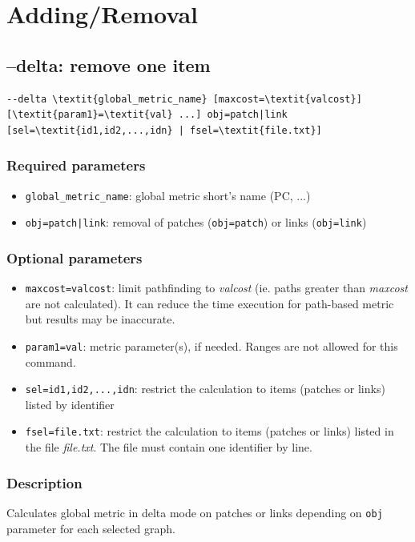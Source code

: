 \documentclass[a4paper,10pt]{report}
\begin{document}
\section{Adding/Removal}
\subsection{--delta: remove one item}
\begin{Verbatim}[commandchars=\\\{\}]
--delta \textit{global_metric_name} [maxcost=\textit{valcost}] [\textit{param1}=\textit{val} ...] obj=patch|link
[sel=\textit{id1,id2,...,idn} | fsel=\textit{file.txt}]
\end{Verbatim}

\subsubsection{Required parameters}
\begin{itemize}
	\item \verb|global_metric_name|: global metric short's name (PC, ...)
	\item \verb+obj=patch|link+: removal of patches (\verb+obj=patch+) or links (\verb+obj=link+)
\end{itemize}

\subsubsection{Optional parameters}
\begin{itemize}
	\item \verb|maxcost=valcost|: limit pathfinding to \textit{valcost} (ie. paths greater than \textit{maxcost} are not calculated). It can reduce the time execution for path-based metric but results may be inaccurate.
	\item \verb|param1=val|: metric parameter(s), if needed. Ranges are not allowed for this command.
	\item \verb|sel=id1,id2,...,idn|: restrict the calculation to items (patches or links) listed by identifier
	\item \verb|fsel=file.txt|: restrict the calculation to items (patches or links) listed in the file \textit{file.txt}. The file must contain one identifier by line.
\end{itemize}

\subsubsection{Description}
Calculates global metric in delta mode on patches or links depending on \verb|obj| parameter for each selected graph. 
\end{document}
